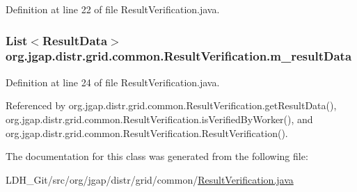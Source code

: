 Definition at line 22 of file Result\-Verification.\-java.

\hypertarget{classorg_1_1jgap_1_1distr_1_1grid_1_1common_1_1_result_verification_a928a0fec21c159d84b94a9a91e053b82}{
\subsubsection[{m\-\_\-result\-Data}]{\setlength{\rightskip}{0pt plus 5cm}List$<${\bf Result\-Data}$>$ org.\-jgap.\-distr.\-grid.\-common.\-Result\-Verification.\-m\-\_\-result\-Data\hspace{0.3cm}{\ttfamily [private]}}}\label{classorg_1_1jgap_1_1distr_1_1grid_1_1common_1_1_result_verification_a928a0fec21c159d84b94a9a91e053b82}


Definition at line 24 of file Result\-Verification.\-java.



Referenced by org.\-jgap.\-distr.\-grid.\-common.\-Result\-Verification.\-get\-Result\-Data(), org.\-jgap.\-distr.\-grid.\-common.\-Result\-Verification.\-is\-Verified\-By\-Worker(), and org.\-jgap.\-distr.\-grid.\-common.\-Result\-Verification.\-Result\-Verification().



The documentation for this class was generated from the following file\-:\begin{DoxyCompactItemize}
\item 
L\-D\-H\-\_\-\-Git/src/org/jgap/distr/grid/common/\hyperlink{_result_verification_8java}{Result\-Verification.\-java}\end{DoxyCompactItemize}
